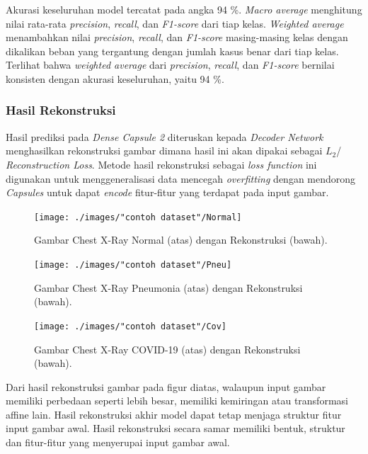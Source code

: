 \documentclass{article}
\begin{document}
   			\par Akurasi keseluruhan model tercatat pada angka 94 \%. \textit{Macro average} menghitung nilai rata-rata \textit{precision}, \textit{recall}, dan \textit{F1-score} dari tiap kelas. \textit{Weighted average} menambahkan nilai \textit{precision}, \textit{recall}, dan \textit{F1-score} masing-masing kelas dengan dikalikan beban yang tergantung dengan jumlah kasus benar dari tiap kelas. Terlihat bahwa \textit{weighted average} dari \textit{precision}, \textit{recall}, dan \textit{F1-score} bernilai konsisten dengan akurasi keseluruhan, yaitu 94 \%.
   		
   		\subsubsection{Hasil Rekonstruksi}
		\par
		Hasil prediksi pada \textit{Dense Capsule 2} diteruskan kepada \textit{Decoder Network} menghasilkan rekonstruksi gambar dimana hasil ini akan dipakai sebagai $L_{2}$/ \textit{Reconstruction Loss}. Metode hasil rekonstruksi sebagai \textit{loss function} ini digunakan untuk menggeneralisasi data mencegah \textit{overfitting} dengan mendorong \textit{Capsules} untuk dapat \textit{encode} fitur-fitur yang terdapat pada input gambar.
		\begin{figure}[H]
			\centering
			\texttt{[image: ./images/"contoh dataset"/Normal]}
			\caption{Gambar Chest X-Ray Normal (atas) dengan Rekonstruksi (bawah).}
		\end{figure}
		\begin{figure}[H]
			\centering
			\texttt{[image: ./images/"contoh dataset"/Pneu]}
			\caption{Gambar Chest X-Ray Pneumonia (atas) dengan Rekonstruksi (bawah).}
		\end{figure}
		\begin{figure}[H]
			\centering
			\texttt{[image: ./images/"contoh dataset"/Cov]}
			\caption{Gambar Chest X-Ray COVID-19 (atas) dengan Rekonstruksi (bawah).}
		\end{figure}
		\par
		Dari hasil rekonstruksi gambar pada figur diatas, walaupun input gambar memiliki perbedaan seperti lebih besar, memiliki kemiringan atau transformasi affine lain. Hasil rekonstruksi akhir model dapat tetap menjaga struktur fitur input gambar awal. Hasil rekonstruksi secara samar memiliki bentuk, struktur dan fitur-fitur yang menyerupai input gambar awal.
   \newpage
\end{document}
